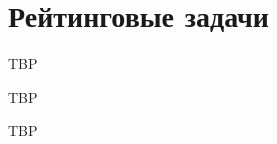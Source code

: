 \documentclass[12pt,a4paper]{article}
\begin{document}
    \section*{Рейтинговые задачи}

    \begin{enumproblem}
        TBP
    \end{enumproblem}

    \begin{enumproblem}
        TBP
    \end{enumproblem}

    \begin{enumproblem}
        TBP
    \end{enumproblem}
    
\end{document}
